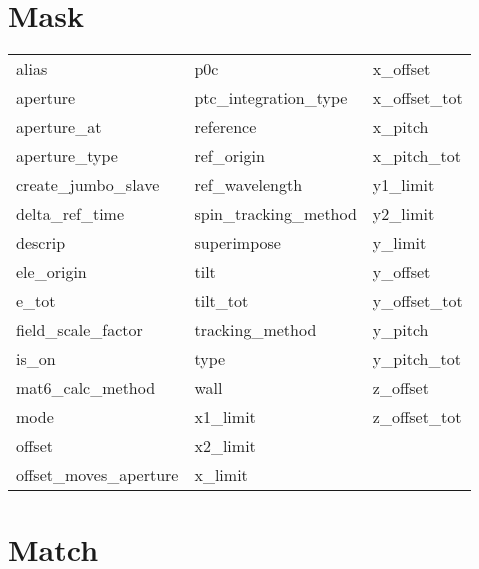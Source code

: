  \section{Mask}
 \label{s:list.mask}
 
 \begin{tabular}{lll} \toprule
alias                       & p0c                         & x_offset                    \\
aperture                    & ptc_integration_type        & x_offset_tot                \\
aperture_at                 & reference                   & x_pitch                     \\
aperture_type               & ref_origin                  & x_pitch_tot                 \\
create_jumbo_slave          & ref_wavelength              & y1_limit                    \\
delta_ref_time              & spin_tracking_method        & y2_limit                    \\
descrip                     & superimpose                 & y_limit                     \\
ele_origin                  & tilt                        & y_offset                    \\
e_tot                       & tilt_tot                    & y_offset_tot                \\
field_scale_factor          & tracking_method             & y_pitch                     \\
is_on                       & type                        & y_pitch_tot                 \\
mat6_calc_method            & wall                        & z_offset                    \\
mode                        & x1_limit                    & z_offset_tot                \\
offset                      & x2_limit                    &                             \\
offset_moves_aperture       & x_limit                     &                             \\
 \bottomrule
 \end{tabular}
 \vfill
 
 \section{Match}
 \label{s:list.match}
 

